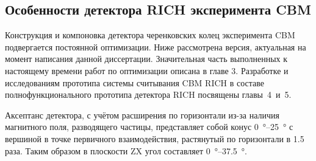 \subsection{Особенности детектора RICH эксперимента CBM}\label{sec:secCBMrich}




Конструкция и компоновка детектора черенковских колец эксперимента CBM подвергается постоянной оптимизации. Ниже рассмотрена версия, актуальная на момент написания данной диссертации. Значительная часть выполненных к настоящему времени работ по оптимизации описана в главе 3. Разработке и исследованиям прототипа системы считывания CBM RICH в составе полнофункционального прототипа детектора RICH посвящены главы~4~и~5. %

Аксептанс детектора, с учётом расширения по горизонтали из-за наличия магнитного поля, разводящего частицы, представляет собой конус \SI{0}{\degree}--\SI{25}{\degree} с вершиной в точке первичного взаимодействия, растянутый по горизонтали в 1.5 раза. Таким образом в плоскости ZX угол составляет \SI{0}{\degree}--\SI{37.5}{\degree}.


